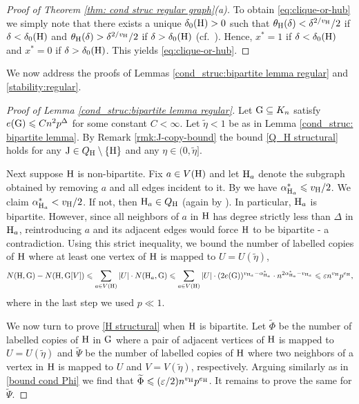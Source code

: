 \documentclass[a4paper,11pt,english,reqno]{amsart}
\numberwithin{equation}{section}
\renewcommand{\leq}{\leqslant}
\newcommand{\uH}{\textup{H}}
\newcommand{\tu}[1]{\textup{#1}}
\begin{document}
\begin{proof}[Proof of Theorem \ref{thm: cond struc regular graph}(a)]
To obtain \eqref{eq:clique-or-hub} we simply note that there exists a unique $\delta_0(\uH) >0$ such that $\theta_{\uH}(\delta) < \delta^{2/v_{\uH}}/2$ if $\delta < \delta_0(\uH)$ and $\theta_{\uH}(\delta) > \delta^{2/v_{\uH}}/2$ if $\delta > \delta_0(\uH)$ (cf.~\cite[Eqn.~(1.4)]{BGLZ}). Hence, $x^*=1$ if $\delta < \delta_0(\uH)$ and $x^*=0$ if $\delta > \delta_0(\uH)$. This yields \eqref{eq:clique-or-hub}. 
\end{proof}








We now address the proofs of Lemmas \ref{cond_struc:bipartite lemma regular} and \ref{stability:regular}. %

\begin{proof}[Proof of Lemma \ref{cond_struc:bipartite lemma regular}]
Let $\tu{G}\subseteq K_{n}$ satisfy $e(\tu{G})\leq Cn^{2}p^{\Delta}$ for some constant $C<\infty$. 
Let $\widetilde \eta<1$ be as in Lemma \ref{cond_struc: bipartite lemma}. By Remark \ref{rmk:J-copy-bound}  the bound \eqref{Q_H structural} holds for any $\tu{J}\in Q_{\uH}\setminus\{\uH\}$ and any $\eta \in (0, \widetilde \eta]$. %

Next suppose $\uH$ is non-bipartite. Fix $a\in V(\uH)$ and let $\uH_{a}$ denote the subgraph obtained by removing $a$  and all edges incident to it. By \cite[Lemma~5.2]{HMS} we have $\alpha_{\uH_{a}}^{*}\leq v_{\uH}/2$. We claim $\alpha_{\uH_{a}}^{*}< v_{\uH}/2$. If not, then  $\uH_{a}\in Q_{\uH}$ (again by \cite[Lemma 5.2]{HMS}). In particular, $\uH_a$ is bipartite. However, since all neighbors of $a$ in $\uH$ has degree  strictly less than $\Delta$ in $\uH_a$, reintroducing $a$ and its adjacent edges would force $\uH$ to be bipartite - a contradiction.  Using this strict inequality, we bound the number of labelled copies of $\uH$ where at least one vertex of $\uH$ is mapped to $U = U(\widetilde \eta)$,
\begin{equation*}
	N(\uH, \tu{G})-N(\uH, \tu{G}[V])\leq \sum_{a\in V(\uH)} |U|\cdot N(\uH_{a}, \tu{G})\leq \sum_{a\in V(\uH)}|U|\cdot (2e(\tu{G}))^{v_{\uH_{a}}-\alpha_{\uH_{a}}^{*}}\cdot n^{2\alpha_{\uH_{a}}^{*}-v_{\uH_{a}}}\leq \varepsilon n^{v_{\uH}}p^{e_{\uH}},
\end{equation*}
where in the last step we used $p\ll1$. 

We now turn to prove \eqref{H structural} when $\uH$ is bipartite. Let $\widetilde\Phi$ be the number of labelled copies of $\uH$ in $\tu{G}$ where a pair of adjacent vertices of $\uH$ is mapped to $U = U(\widetilde \eta)$ and $\widetilde \Psi$ be the number of labelled copies of $\uH$ where two neighbors of a vertex in $\uH$ is mapped to $U$ and $V=V(\widetilde \eta)$, respectively. Arguing similarly as in \eqref{bound cond Phi} we find that $\widetilde \Phi\leq (\varepsilon/2) n^{v_{\uH}}p^{e_{\uH}}$. It remains to prove the same for $\widetilde\Psi$. 


\end{proof}
\end{document}
